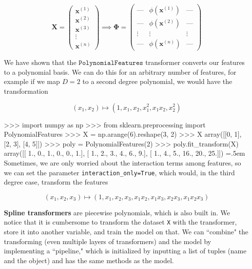 \documentclass{article}
\theoremstyle{definition}
\newenvironment{cverbatim}
    {\SaveVerbatim{cverb}}
    {\endSaveVerbatim
    \flushleft\fboxrule=0pt\fboxsep=.5em
    \colorbox{cverbbg}{%
      \makebox[\dimexpr\linewidth-2\fboxsep][l]{\BUseVerbatim{cverb}}%
    }
    \endflushleft
  }
\begin{document}
      \[\mathbf{X} = \begin{pmatrix} \mathbf{x}^{(1)} \\ \mathbf{x}^{(2)} \\ \mathbf{x}^{(3)} \\ \vdots \\ \mathbf{x}^{(n)} \end{pmatrix} \implies \boldsymbol{\Phi} = \begin{pmatrix}
      \text{---} & \phi(\mathbf{x}^{(1)}) & \text{---} \\
      \text{---} & \phi(\mathbf{x}^{(2)}) & \text{---} \\
      \vdots & \vdots & \vdots \\
      \text{---} & \phi(\mathbf{x}^{(n)}) & \text{---}
      \end{pmatrix}\]

    We have shown that the $\texttt{PolynomialFeatures}$ transformer converts our features to a polynomial basis. We can do this for an arbitrary number of features, for example if we map $D = 2$ to a second degree polynomial, we would have the transformation 

    \[(x_1, x_2) \mapsto (1, x_1, x_2, x_1^2, x_1 x_2, x_2^2)\]

    \begin{cverbatim}
    >>> import numpy as np
    >>> from sklearn.preprocessing import PolynomialFeatures
    >>> X = np.arange(6).reshape(3, 2)
    >>> X
    array([[0, 1],
           [2, 3],
           [4, 5]])
    >>> poly = PolynomialFeatures(2)
    >>> poly.fit_transform(X)
    array([[ 1.,  0.,  1.,  0.,  0.,  1.],
           [ 1.,  2.,  3.,  4.,  6.,  9.],
           [ 1.,  4.,  5., 16., 20., 25.]])
    \end{cverbatim}
    Sometimes, we are only worried about the interaction terms among features, so we can set the parameter \texttt{interaction\_only=True}, which would, in the third degree case, transform the features 

      \[(x_1, x_2, x_3) \mapsto (1, x_1, x_2, x_3, x_1 x_2, x_1 x_3, x_2 x_3, x_1 x_2 x_3)\]

    \textbf{Spline transformers} are piecewise polynomials, which is also built in. We notice that it is cumbersome to transform the dataset \texttt{X} with the transformer, store it into another variable, and train the model on that. We can ``combine" the transforming (even multiple layers of transformers) and the model by implementing a ``pipeline," which is initialized by inputting a list of tuples (name and the object) and has the same methods as the model. 
\end{document}
